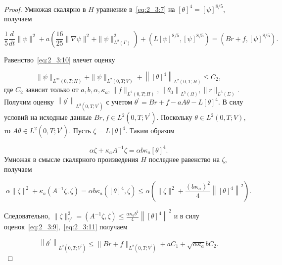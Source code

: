 \begin{proof}
    Умножая скалярно в $H$ уравнение в~\eqref{eq:2_3:7}
    на $[\theta]^{4}=[\psi]^{8 / 5}$, получаем

    \begin{equation}
        \label{eq:2_3:10}
        \frac{1}{5} \frac{d}{d t}\|\psi\|^{2}+a\left(\frac{16}{25}\|\nabla \psi\|^{2}
        + \|\psi\|_{L^{2}(\Gamma)}^{2}\right)+
        \left(L[\psi]^{8 / 5},[\psi]^{8 / 5}\right)=\left(B r+f,[\psi]^{8 / 5}\right).
    \end{equation}

    Равенство~\eqref{eq:2_3:10} влечет оценку

    \begin{equation}
        \label{eq:2_3:11}
        \|\psi\|_{L^{\infty}(0, T ; H)}+\|\psi\|_{L^{2}(0, T ; V)}+
        \left\|[\theta]^{4}\right\|_{L^{2}(0, T ; H)} \leq C_{2},
    \end{equation}
    где $C_{2}$ зависит только от
    $a, b, \alpha, \kappa_{a},\|f\|_{L^{2}(0, T ; H)},
    \left\|\theta_{0}\right\|_{L^{5}(\Omega)},\|r\|_{L^{5}(\Sigma)}$.
    Получим оценку
    $\left\|\theta^{\prime}\right\|_{L^{2}\left(0, T ; V^{\prime}\right)}$
    с учетом $ \theta^{\prime}=B r+f-a A \theta-L[\theta]^{4}$.
    В силу условий на исходные данные
    $B r, f \in L^{2}\left(0, T ; V^{\prime}\right)$.
    Поскольку $\theta \in L^{2}(0, T ; V)$,
    то $A \theta \in L^{2}\left(0, T ; V^{\prime}\right)$.
    Пусть $\zeta=L[\theta]^{4}$.
    Таким образом

    \[
        \alpha \zeta+\kappa_{a} A^{-1} \zeta=\alpha b \kappa_{a}[\theta]^{4}.
    \]
    Умножая в смысле скалярного произведения $H$
    последнее равенство на $\zeta$, получаем

    \[
        \alpha\|\zeta\|^{2}+\kappa_{a}\left(A^{-1} \zeta,
        \zeta\right)=\alpha b \kappa_{a}\left([\theta]^{4},
        \zeta\right) \leq \alpha\left(\|\zeta\|^{2}
        +\frac{\left(b \kappa_{a}\right)^{2}}{4}\left\|
        [\theta]^{4}\right\|^{2}\right).
    \]


    Следовательно, $\|\zeta\|_{V^{\prime}}^{2}=\left(A^{-1} \zeta,
    \zeta\right) \leq \frac{\alpha \kappa_{ a} b^{2}}{4}\left\|[\theta]^{4}\right\|^{2}$
    и в силу оценок~\eqref{eq:2_3:9},~\eqref{eq:2_3:11} получаем

    \begin{equation}
        \label{eq:2_3:12}
        \left\|\theta^{\prime}\right\|_{L^{2}\left(0, T; V^{\prime}\right)}
        \leq\|B r+f\|_{L^{2}\left(0, T ; V^{\prime}\right)}+a C_{1}+\sqrt{\alpha \kappa_{a}} b C_{2}.
    \end{equation}



\end{proof}
